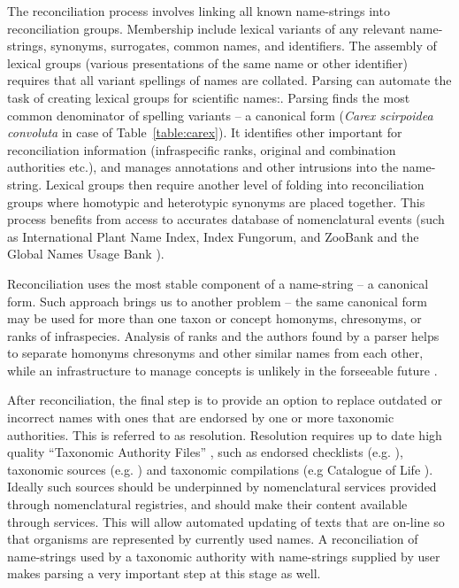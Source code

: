 \documentclass{bmcart}
\begin{document}
The reconciliation process involves linking all known name-strings into
reconciliation groups. Membership include lexical variants of any relevant
name-strings, synonyms, surrogates, common names, and identifiers.  The
assembly of lexical groups (various presentations of the same name or other
identifier) requires that all variant spellings of names are collated. Parsing
can automate the task of creating lexical groups for scientific names:. Parsing
finds the most common denominator of spelling variants – a canonical form
(\textit{Carex scirpoidea convoluta} in case of Table~\ref{table:carex}). It
identifies other important for reconciliation information (infraspecific ranks,
original and combination authorities etc.), and manages annotations and other
intrusions into the name-string. Lexical groups then require another level of
folding into reconciliation groups where homotypic and heterotypic synonyms are
placed together. This process benefits from access to accurates database of
nomenclatural events (such as International Plant Name Index, Index Fungorum,
and ZooBank and the Global Names Usage Bank \cite{Pyle2003}).

Reconciliation uses the most stable component of a name-string – a canonical
form. Such approach brings us to another problem – the same canonical form may
be used for more than one taxon or concept \cite{Remsen2016} homonyms, chresonyms,
or ranks of infraspecies. Analysis of ranks and the authors found by a parser
helps to separate homonyms chresonyms and other  similar names from each other,
while an infrastructure to manage concepts is unlikely in the forseeable future
\cite{Patterson:inpress-a}.

After reconciliation, the final step is to provide an option to replace outdated
or incorrect names with ones that are endorsed by one or more taxonomic
authorities. This is referred to as resolution. Resolution requires up to date
high quality ``Taxonomic Authority Files'' \cite{VandenBerghe2015}, such as
endorsed checklists (e.g. \cite{Zermoglio2016}), taxonomic sources (e.g.
\cite{Boyle2013}) and taxonomic compilations  (e.g Catalogue of Life
\cite{col}). Ideally such sources should be underpinned by nomenclatural
services provided through nomenclatural registries, and should make their
content available through services.  This will allow automated updating of
texts that are on-line so that organisms are represented by currently used
names. A reconciliation of name-strings used by a taxonomic authority with
name-strings supplied by user makes parsing a very important step at this stage
as well.
\end{document}
